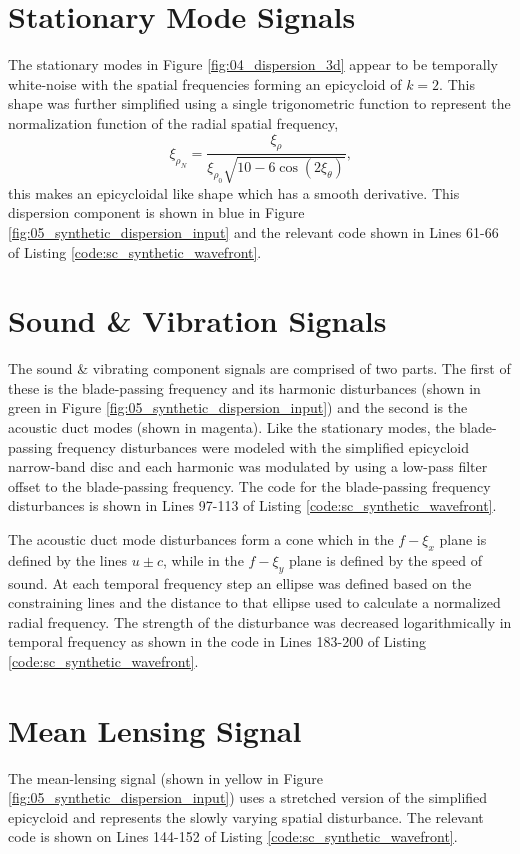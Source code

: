 \section{Stationary Mode Signals}
The stationary modes in Figure \ref{fig:04_dispersion_3d} appear to be temporally white-noise with the spatial frequencies forming an epicycloid of $k=2$.
This shape was further simplified using a single trigonometric function to represent the normalization function of the radial spatial frequency,
\begin{equation}
 \xi_{\rho_N} = \frac{\xi_\rho}{\xi_{\rho_0}\sqrt{10-6\cos{(2\xi_\theta)}}} \textrm{,}
\end{equation}
this makes an epicycloidal like shape which has a smooth derivative.
This dispersion component is shown in blue in Figure \ref{fig:05_synthetic_dispersion_input} and the relevant code shown in Lines 61-66 of Listing \ref{code:sc_synthetic_wavefront}.

\section{Sound \& Vibration Signals}
The sound \& vibrating component signals are comprised of two parts.
The first of these is the blade-passing frequency and its harmonic disturbances (shown in green in Figure \ref{fig:05_synthetic_dispersion_input}) and the second is the acoustic duct modes (shown in magenta).
Like the stationary modes, the blade-passing frequency disturbances were modeled with the simplified epicycloid narrow-band disc and each harmonic was modulated by using a low-pass filter offset to the blade-passing frequency.
The code for the blade-passing frequency disturbances is shown in Lines 97-113 of Listing \ref{code:sc_synthetic_wavefront}.

The acoustic duct mode disturbances form a cone which in the $f-\xi_x$ plane is defined by the lines $u\pm c$, while in the $f-\xi_y$ plane is defined by the speed of sound.
At each temporal frequency step an ellipse was defined based on the constraining lines and the distance to that ellipse used to calculate a normalized radial frequency.
The strength of the disturbance was decreased logarithmically in temporal frequency as shown in the code in Lines 183-200 of Listing \ref{code:sc_synthetic_wavefront}.

\section{Mean Lensing Signal}
The mean-lensing signal (shown in yellow in Figure \ref{fig:05_synthetic_dispersion_input}) uses a stretched version of the simplified epicycloid and represents the slowly varying spatial disturbance.
The relevant code is shown on Lines 144-152 of Listing \ref{code:sc_synthetic_wavefront}.

